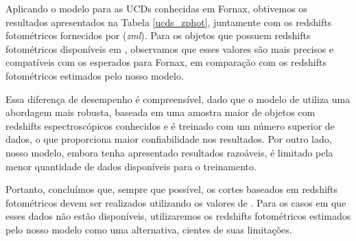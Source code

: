 Aplicando o modelo para as UCDs conhecidas em Fornax, obtivemos os resultados apresentados na Tabela \ref{ucds_zphot}, juntamente com os redshifts fotométricos fornecidos por \cite{erik_photoz_2024} (\textit{zml}). Para os objetos que possuem redshifts fotométricos disponíveis em \citep{erik_photoz_2024}, observamos que esses valores são mais precisos e compatíveis com os esperados para Fornax, em comparação com os redshifts fotométricos estimados pelo nosso modelo.

Essa diferença de desempenho é compreensível, dado que o modelo de \cite{erik_photoz_2024} utiliza uma abordagem mais robusta, baseada em uma amostra maior de objetos com redshifts espectroscópicos conhecidos e é treinado com um número superior de dados, o que proporciona maior confiabilidade nos resultados. Por outro lado, nosso modelo, embora tenha apresentado resultados razoáveis, é limitado pela menor quantidade de dados disponíveis para o treinamento.

Portanto, concluímos que, sempre que possível, os cortes baseados em redshifts fotométricos devem ser realizados utilizando os valores de \cite{erik_photoz_2024}. Para os casos em que esses dados não estão disponíveis, utilizaremos os redshifts fotométricos estimados pelo nosso modelo como uma alternativa, cientes de suas limitações.


